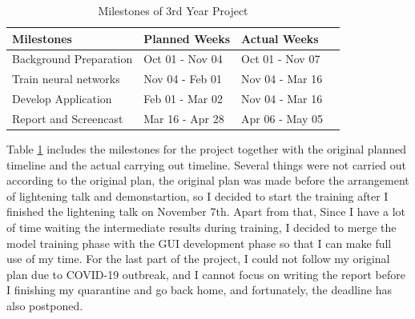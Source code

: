\begin{table}
    \begin{center}
    \begin{tabular}{|l|l|l|l|}\hline\hline
    Milestones&Planned Weeks&Actual Weeks\\
    \hline
    Background Preparation&Oct 01 - Nov 04&Oct 01 - Nov 07\\
    Train neural networks&Nov 04 - Feb 01&Nov 04 - Mar 16\\
    Develop Application&Feb 01 - Mar 02&Nov 04 - Mar 16\\
    Report and Screencast&Mar 16 - Apr 28&Apr 06 - May 05\\
    \hline\hline
    \end{tabular}
    \end{center}
    \caption{Milestones of 3rd Year Project}
    \label{milestones table}
\end{table}

Table \ref{milestones table} includes the milestones for the project together with 
the original planned timeline and the actual carrying out timeline. Several things 
were not carried out according to the original plan, the original plan was made 
before the arrangement of lightening talk and demonstartion, so I decided to start 
the training after I finished the lightening talk on November 7th. Apart from that, 
Since I have a lot of time waiting the intermediate results during training, I decided
to merge the model training phase with the GUI development phase so that I can make 
full use of my time. For the last part of the project, I could not follow my original 
plan due to COVID-19 outbreak, and I cannot focus on writing the report before I finishing
my quarantine and go back home, and fortunately, the deadline has also postponed.

